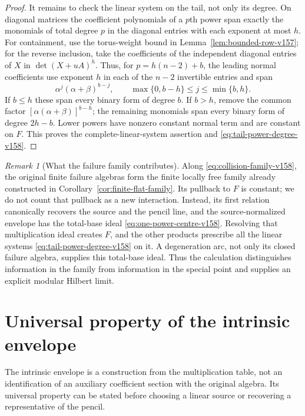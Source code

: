 \documentclass[11pt,reqno]{amsart}
\numberwithin{equation}{section}
\theoremstyle{definition}\newtheorem{definition}[theorem]{Definition}
\theoremstyle{remark}\newtheorem{remark}[theorem]{Remark}
\begin{document}
\begin{proof}
It remains to check the linear system on the tail, not only its
degree. On diagonal matrices the coefficient polynomials of a $p$th
power span exactly the monomials of total degree $p$ in the diagonal
entries with each exponent at most $h$. For containment, use the
torus-weight bound in Lemma~\ref{lem:bounded-row-v157}; for the reverse
inclusion, take the coefficients of the independent diagonal entries
of $X$ in $\det(X+uA)^h$. Thus, for $p=h(n-2)+b$, the leading normal
coefficients use exponent $h$ in each of the $n-2$ invertible entries
and span
\[
  \alpha^j(\alpha+\beta)^{b-j},\qquad
           \max\{0,b-h\}\leq j\leq\min\{b,h\}.
\]
If $b\leq h$ these span every
binary form of degree $b$. If $b>h$, remove the common factor
$[\alpha(\alpha+\beta)]^{b-h}$; the remaining monomials span every binary form of
degree $2h-b$. Lower powers have nonzero constant normal term and
are constant on $F$. This proves the complete-linear-system assertion
and \eqref{eq:tail-power-degree-v158}.
\end{proof}

\begin{remark}[What the failure family contributes]
\label{rem:tail-integration-v158}
Along \eqref{eq:collision-family-v158}, the original finite failure
algebras form the finite locally free family already constructed in
Corollary~\ref{cor:finite-flat-family}. Its pullback to $F$ is constant;
we do not count that pullback as a new interaction. Instead, its first
relation canonically recovers the source and the pencil line, and the
source-normalized envelope has the total-base ideal
\eqref{eq:one-power-centre-v158}. Resolving that multiplication ideal
creates $F$, and the other products prescribe all the linear systems
\eqref{eq:tail-power-degree-v158} on it. A degeneration arc, not only
its closed failure algebra, supplies this total-base ideal. Thus the
calculation distinguishes information in the family from information
in the special point and supplies an explicit modular Hilbert limit.
\end{remark}

\section{Universal property of the intrinsic envelope}
\label{sec:universal-envelope-v159}
The intrinsic envelope is a construction from the multiplication table,
not an identification of an auxiliary coefficient section with the
original algebra. Its universal property can be stated before choosing
a linear source or recovering a representative of the pencil.
\end{document}

